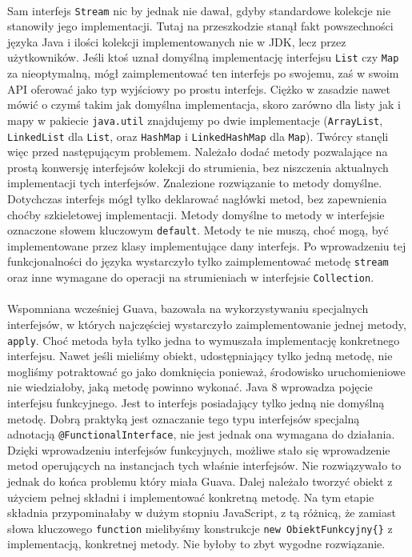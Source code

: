 \documentclass[a4paper,10pt]{report}
\begin{document}
\paragraph{}
Sam interfejs \verb|Stream| nic by jednak nie dawał, gdyby standardowe kolekcje nie stanowiły jego implementacji. Tutaj na przeszkodzie stanął fakt powszechności języka Java i ilości kolekcji implementowanych nie w JDK, lecz przez użytkowników. Jeśli ktoś uznał domyślną implementację interfejsu \verb|List| czy \verb|Map| za nieoptymalną, mógł zaimplementować ten interfejs po swojemu, zaś w swoim API oferować jako typ wyjściowy po prostu interfejs. Ciężko w zasadzie nawet mówić o czymś takim jak domyślna implementacja, skoro zarówno dla listy jak i mapy w pakiecie \verb|java.util| znajdujemy po dwie implementacje (\verb|ArrayList|, \verb|LinkedList| dla \verb|List|, oraz \verb|HashMap| i \verb|LinkedHashMap| dla \verb|Map|). Twórcy stanęli więc przed następującym problemem. Należało dodać metody pozwalające na prostą konwersję interfejsów kolekcji do strumienia, bez niszczenia aktualnych implementacji tych interfejsów. Znalezione rozwiązanie to metody domyślne. Dotychczas interfejs mógł tylko deklarować nagłówki metod, bez zapewnienia choćby szkieletowej implementacji. Metody domyślne to metody w interfejsie oznaczone słowem kluczowym \verb|default|. Metody te nie muszą, choć mogą, być implementowane przez klasy implementujące dany interfejs. Po wprowadzeniu tej funkcjonalności do języka wystarczyło tylko zaimplementować metodę \verb|stream| oraz inne wymagane do operacji na strumieniach w interfejsie \verb|Collection|.
\paragraph{}
Wspomniana wcześniej Guava, bazowała na wykorzystywaniu specjalnych interfejsów, w których najczęściej wystarczyło zaimplementowanie jednej metody, \verb|apply|. Choć metoda była tylko jedna to wymuszała implementację konkretnego interfejsu. Nawet jeśli mieliśmy obiekt, udostępniający tylko jedną metodę, nie mogliśmy potraktować go jako domknięcia ponieważ, środowisko uruchomieniowe nie wiedziałoby, jaką metodę powinno wykonać. Java 8 wprowadza pojęcie interfejsu funkcyjnego. Jest to interfejs posiadający tylko jedną nie domyślną metodę. Dobrą praktyką jest oznaczanie tego typu interfejsów specjalną adnotacją \verb|@FunctionalInterface|, nie jest jednak ona wymagana do działania. Dzięki wprowadzeniu interfejsów funkcyjnych, możliwe stało się wprowadzenie metod operujących na instancjach tych właśnie interfejsów. Nie rozwiązywało to jednak do końca problemu który miała Guava. Dalej należało tworzyć obiekt z użyciem pełnej składni i implementować konkretną metodę. Na tym etapie składnia przypominałaby w dużym stopniu JavaScript, z tą różnicą, że zamiast słowa kluczowego \verb|function| mielibyśmy konstrukcje \verb|new ObiektFunkcyjny{}| z implementacją, konkretnej metody. Nie byłoby to zbyt wygodne rozwiązanie.
\end{document}
